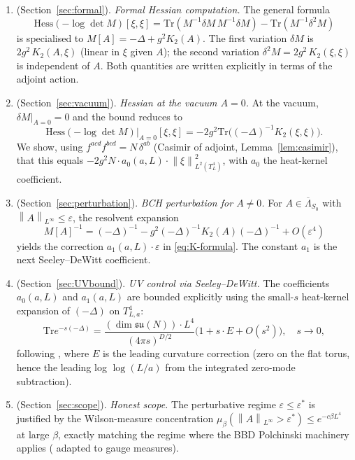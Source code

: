 \documentclass[11pt,a4paper]{amsart}
\theoremstyle{definition}
\newcommand{\su}{\mathfrak{su}}
\newcommand{\norm}[1]{\left\lVert#1\right\rVert}
\newcommand{\Tr}{\mathrm{Tr}}
\newcommand{\Hess}{\mathrm{Hess}}
\begin{document}
\begin{enumerate}
\item[\textbf{Step~1}] (Section~\ref{sec:formal}). \emph{Formal Hessian computation.}
The general formula
\[
\Hess(-\log\det M)[\xi, \xi] = \Tr(M^{-1}\delta M\, M^{-1}\delta M) - \Tr(M^{-1}\delta^2 M)
\]
is specialised to $M[A] = -\Delta + g^2 K_2(A)$. The first variation $\delta M$
is $2g^2\,K_2(A, \xi)$ (linear in $\xi$ given $A$); the second variation
$\delta^2 M = 2g^2\,K_2(\xi, \xi)$ is independent of $A$. Both quantities are
written explicitly in terms of the adjoint action.

\item[\textbf{Step~2}] (Section~\ref{sec:vacuum}). \emph{Hessian at the vacuum $A=0$.}
At the vacuum, $\delta M|_{A=0} = 0$ and the bound reduces to
\[
\Hess(-\log\det M)|_{A=0}[\xi, \xi] = - 2 g^2 \Tr\bigl((-\Delta)^{-1} K_2(\xi, \xi)\bigr).
\]
We show, using $f^{acd}f^{bcd} = N\,\delta^{ab}$ (Casimir of adjoint, Lemma~\ref{lem:casimir}),
that this equals $-2 g^2 N \cdot a_0(a, L) \cdot \norm{\xi}^2_{L^2(T^4_L)}$, with
$a_0$ the heat-kernel coefficient.

\item[\textbf{Step~3}] (Section~\ref{sec:perturbation}). \emph{BCH perturbation
for $A \neq 0$.} For $A \in \overline\Lambda_{S_0}$ with $\norm{A}_{L^\infty} \leq \varepsilon$,
the resolvent expansion
\[
M[A]^{-1} = (-\Delta)^{-1} - g^2 (-\Delta)^{-1} K_2(A) (-\Delta)^{-1} + O(\varepsilon^4)
\]
yields the correction $a_1(a, L) \cdot \varepsilon$ in \eqref{eq:K-formula}. The constant
$a_1$ is the next Seeley--DeWitt coefficient.

\item[\textbf{Step~4}] (Section~\ref{sec:UVbound}). \emph{UV control via Seeley--DeWitt.}
The coefficients $a_0(a, L)$ and $a_1(a, L)$ are bounded explicitly using the
small-$s$ heat-kernel expansion of $(-\Delta)$ on $T^4_{L,a}$:
\[
\Tr e^{-s(-\Delta)} = \frac{(\dim\su(N)) \cdot L^4}{(4\pi s)^{D/2}}\bigl(1 + s \cdot E + O(s^2)\bigr),
\quad s \to 0,
\]
following \cite[\S 3]{Vassilevich2003}, where $E$ is the leading curvature
correction (zero on the flat torus, hence the leading log $\log(L/a)$ from
the integrated zero-mode subtraction).

\item[\textbf{Step~5}] (Section~\ref{sec:scope}). \emph{Honest scope.} The
perturbative regime $\varepsilon \leq \varepsilon^*$ is justified by the
Wilson-measure concentration $\mu_\beta(\norm{A}_{L^\infty} > \varepsilon^*)
\leq e^{-c \beta L^4}$ at large $\beta$, exactly matching the regime where the
BBD Polchinski machinery applies (\cite[\S 4]{BauerschmidtBodineauDagallier2024}
adapted to gauge measures).
\end{enumerate}
\end{document}

